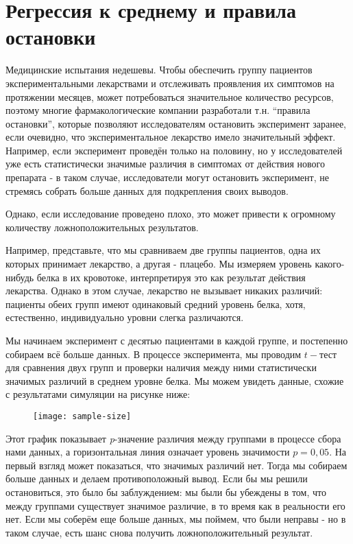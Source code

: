\chapter{Регрессия к среднему и правила остановки}
\label{chp7}

Медицинские испытания недешевы. Чтобы обеспечить группу пациентов экспериментальными лекарствами и отслеживать проявления их симптомов на протяжении месяцев, может потребоваться значительное количество ресурсов, поэтому многие фармакологические компании разработали т.н. ``правила остановки'', которые позволяют исследователям остановить эксперимент заранее, если очевидно, что экспериментальное лекарство имело значительный эффект. Например, если эксперимент проведён только на половину, но у исследователей уже есть статистически значимые различия в симптомах от действия нового препарата - в таком случае, исследователи могут остановить эксперимент, не стремясь собрать больше данных для подкрепления своих выводов.

Однако, если исследование проведено плохо, это может привести к огромному количеству ложноположительных результатов. 

Например, представьте, что мы сравниваем две группы пациентов, одна их которых принимает лекарство, а другая - плацебо. Мы измеряем уровень какого-нибудь белка в их кровотоке, интерпретируя это как результат действия лекарства. Однако в этом случае, лекарство не вызывает никаких различий: пациенты обеих групп имеют одинаковый средний уровень белка, хотя, естественно, индивидуально уровни слегка различаются. 

Мы начинаем эксперимент с десятью пациентами в каждой группе, и постепенно собираем всё больше данных. В процессе эксперимента, мы проводим $t-$тест для сравнения двух групп и проверки наличия между ними статистически значимых различий в среднем уровне белка. Мы можем увидеть данные, схожие с результатами симуляции на рисунке ниже:


\newpage %

\begin{figure}[h!]
    \centering
    \texttt{[image: sample-size]}
    \label{fig9:sample-size}
\end{figure}

Этот график показывает \emph{p}-значение различия между группами в процессе сбора нами данных, а горизонтальная линия означает уровень значимости $p = 0,05$. На первый взгляд может показаться, что значимых различий нет. Тогда мы собираем больше данных и делаем противоположный вывод. Если бы мы решили остановиться, это было бы заблуждением: мы были бы убеждены в том, что между группами существует значимое различие, в то время как в реальности его нет. Если мы соберём еще больше данных, мы поймем, что были неправы - но в таком случае, есть шанс снова получить ложноположительный результат.  

